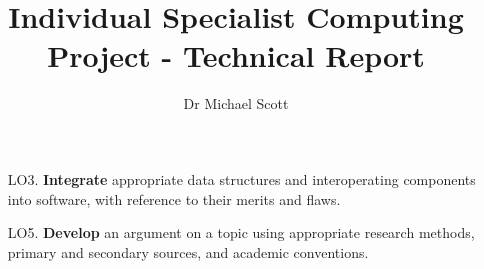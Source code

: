 \documentclass{../../fal_assignment}
\title{Individual Specialist Computing Project - Technical Report}
\author{Dr Michael Scott}
\begin{document}

    


\begin{itemize}
	\setlength{\itemindent}{1em}
	\item[LO3. ] \textbf{Integrate} appropriate data structures and interoperating components into software, with reference to their merits and flaws.
	\item[LO5. ] \textbf{Develop} an argument on a topic using appropriate research methods, primary and secondary sources, and academic conventions.
\end{itemize}
\end{document}
